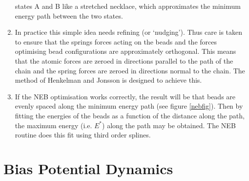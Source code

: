 \begin{enumerate}
states A and B like a stretched necklace, which approximates the
minimum energy path between the two states.
\item In practice this simple idea needs refining (or
`nudging'). Thus care is taken to ensure that the springs forces
acting on the beads and the forces optimising bead configurations are
approximately orthogonal. This means that the atomic forces are zeroed
in directions parallel to the path of the chain and the spring forces
are zeroed in directions normal to the chain. The method of Henkelman
and Jonsson \cite{henkelman-00a} is designed to achieve this.
\item If the NEB optimisation works correctly, the result will be that
beads are evenly spaced along the minimum energy path (see figure
\ref{nebfig}). Then by fitting the energies of the beads as a function
of the distance along the path, the maximum energy (i.e. $E^{*}$)
along the path may be obtained. The \D{} NEB routine does this fit using
third order splines.
\end{enumerate}

\section{Bias Potential Dynamics}
\label{BPD}
